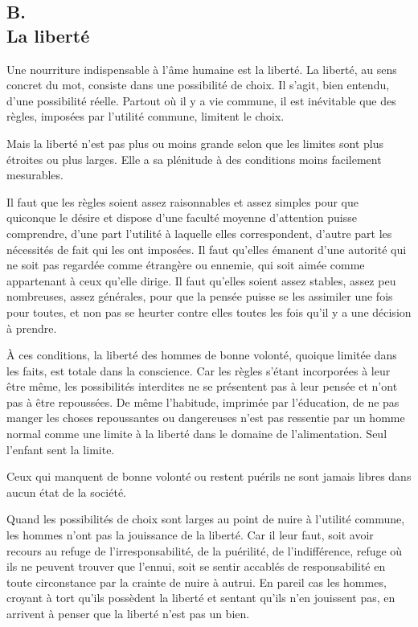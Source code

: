 \documentclass[french,twoside]{book} %
\begin{document}
\subsection[B. La liberté]{B. \\
La liberté}
\noindent \par
Une nourriture indispensable à l'âme humaine est la liberté. La liberté, au sens concret du mot, consiste dans une possibilité de choix. Il s'agit, bien entendu, d'une possibilité réelle. Partout où il y a vie commune, il est inévitable que des règles, imposées par l'utilité commune, limitent le choix.\par
Mais la liberté n'est pas plus ou moins grande selon que les limites sont plus étroites ou plus larges. Elle a sa plénitude à des conditions moins facilement mesurables.\par
Il faut que les règles soient assez raisonnables et assez simples pour que quiconque le désire et dispose d'une faculté moyenne d'attention puisse comprendre, d'une part l'utilité à laquelle elles correspondent, d'autre part les nécessités de fait qui les ont imposées. Il faut qu'elles émanent d'une autorité qui ne soit pas regardée comme étrangère ou ennemie, qui soit aimée comme appartenant à ceux qu'elle dirige. Il faut qu'elles soient assez stables, assez peu nombreuses, assez générales, pour que la pensée puisse se les assimiler une fois pour toutes, et non pas se heurter contre elles toutes les fois qu'il y a une décision à prendre.\par
À ces conditions, la liberté des hommes de bonne volonté, quoique limitée dans les faits, est totale dans la conscience. Car les règles s'étant incorporées à leur être même, les possibilités interdites ne se présentent pas à leur pensée et n'ont pas à être repoussées. De même l'habitude, imprimée par l'éducation, de ne pas manger les choses repoussantes ou dangereuses n'est pas ressentie par un homme normal comme une limite à la liberté dans le domaine de l'alimentation. Seul l'enfant sent la limite.\par
Ceux qui manquent de bonne volonté ou restent puérils ne sont jamais libres dans aucun état de la société.\par
Quand les possibilités de choix sont larges au point de nuire à l'utilité commune, les hommes n'ont pas la jouissance de la liberté. Car il leur faut, soit avoir recours au refuge de l'irresponsabilité, de la puérilité, de l'indifférence, refuge où ils ne peuvent trouver que l'ennui, soit se sentir accablés de responsabilité en toute circonstance par la crainte de nuire à autrui. En pareil cas les hommes, croyant à tort qu'ils possèdent la liberté et sentant qu'ils n'en jouissent pas, en arrivent à penser que la liberté n'est pas un bien.
\end{document}

